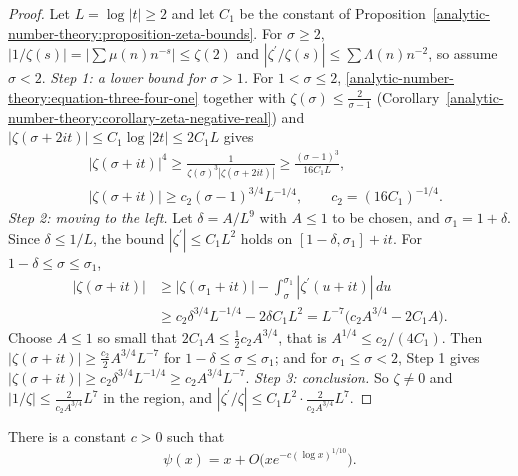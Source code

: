 \begin{proof}
Let $L = \log|t| \geq 2$ and let $C_1$ be the constant of Proposition~\ref{analytic-number-theory:proposition-zeta-bounds}. For $\sigma \geq 2$, $|1/\zeta(s)| = |\sum\mu(n)n^{-s}| \leq \zeta(2)$ and
$|\zeta^{\prime}/\zeta(s)| \leq \sum\Lambda(n)n^{-2}$, so assume $\sigma < 2$.
\emph{Step 1: a lower bound for $\sigma > 1$.} For $1 < \sigma \leq 2$, \eqref{analytic-number-theory:equation-three-four-one} together with $\zeta(\sigma) \leq \frac{2}{\sigma - 1}$
(Corollary~\ref{analytic-number-theory:corollary-zeta-negative-real}) and $|\zeta(\sigma + 2it)| \leq C_1\log|2t| \leq 2C_1L$ gives
\[
\begin{aligned}
&|\zeta(\sigma + it)|^4 \geq \frac{1}{\zeta(\sigma)^3|\zeta(\sigma + 2it)|} \geq \frac{(\sigma - 1)^3}{16C_1L}, \\
&|\zeta(\sigma + it)| \geq c_2(\sigma - 1)^{3/4}L^{-1/4}, \qquad c_2 = (16C_1)^{-1/4}.
\end{aligned}
\]
\emph{Step 2: moving to the left.} Let $\delta = A/L^9$ with $A \leq 1$ to be chosen, and $\sigma_1 = 1 + \delta$. Since $\delta \leq 1/L$, the bound $|\zeta^{\prime}| \leq C_1L^2$ holds on
$[1 - \delta, \sigma_1] + it$. For $1 - \delta \leq \sigma \leq \sigma_1$,
\[
\begin{aligned}
|\zeta(\sigma + it)| &\geq |\zeta(\sigma_1 + it)| - \int_\sigma^{\sigma_1}|\zeta^{\prime}(u + it)|\,du \\
&\geq c_2\delta^{3/4}L^{-1/4} - 2\delta C_1L^2 = L^{-7}\bigl(c_2A^{3/4} - 2C_1A\bigr).
\end{aligned}
\]
Choose $A \leq 1$ so small that $2C_1A \leq \frac12c_2A^{3/4}$, that is $A^{1/4} \leq c_2/(4C_1)$. Then $|\zeta(\sigma + it)| \geq \frac{c_2}2A^{3/4}L^{-7}$ for $1 - \delta \leq \sigma \leq \sigma_1$; and for
$\sigma_1 \leq \sigma < 2$, Step 1 gives $|\zeta(\sigma + it)| \geq c_2\delta^{3/4}L^{-1/4} \geq c_2A^{3/4}L^{-7}$.
\emph{Step 3: conclusion.} So $\zeta \neq 0$ and $|1/\zeta| \leq \frac{2}{c_2A^{3/4}}L^7$ in the region, and $|\zeta^{\prime}/\zeta| \leq C_1L^2\cdot\frac{2}{c_2A^{3/4}}L^7$.
\end{proof}

\begin{theorem}\label{analytic-number-theory:theorem-pnt-error}
There is a constant $c > 0$ such that
\[
\psi(x) = x + O\bigl(xe^{-c(\log x)^{1/10}}\bigr).
\]
\end{theorem}

